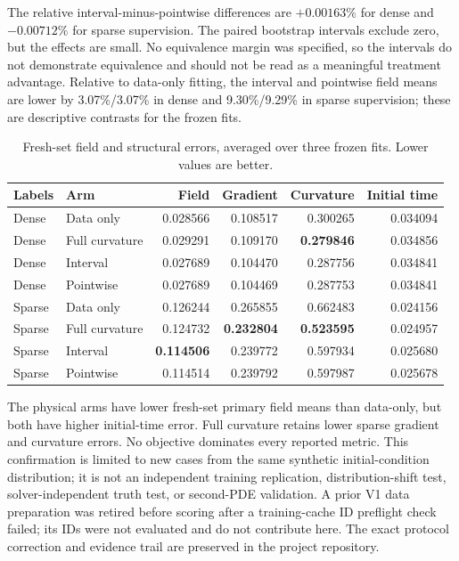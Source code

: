 \documentclass[10pt,a4paper]{article}
\begin{document}
The relative interval-minus-pointwise differences are $+0.00163\%$ for dense and $-0.00712\%$ for sparse supervision. The paired bootstrap intervals exclude zero, but the effects are small. No equivalence margin was specified, so the intervals do not demonstrate equivalence and should not be read as a meaningful treatment advantage. Relative to data-only fitting, the interval and pointwise field means are lower by 3.07\%/3.07\% in dense and 9.30\%/9.29\% in sparse supervision; these are descriptive contrasts for the frozen fits.

\begin{table}[H]
\centering\scriptsize
\caption{Fresh-set field and structural errors, averaged over three frozen fits. Lower values are better.}
\label{tab:allen-fresh-structure}
\begin{tabular}{llrrrr}
\toprule
Labels & Arm & Field & Gradient & Curvature & Initial time \\
\midrule
Dense & Data only & 0.028566 & 0.108517 & 0.300265 & 0.034094 \\
Dense & Full curvature & 0.029291 & 0.109170 & \textbf{0.279846} & 0.034856 \\
Dense & Interval & 0.027689 & 0.104470 & 0.287756 & 0.034841 \\
Dense & Pointwise & 0.027689 & 0.104469 & 0.287753 & 0.034841 \\
\midrule
Sparse & Data only & 0.126244 & 0.265855 & 0.662483 & 0.024156 \\
Sparse & Full curvature & 0.124732 & \textbf{0.232804} & \textbf{0.523595} & 0.024957 \\
Sparse & Interval & \textbf{0.114506} & 0.239772 & 0.597934 & 0.025680 \\
Sparse & Pointwise & 0.114514 & 0.239792 & 0.597987 & 0.025678 \\
\bottomrule
\end{tabular}
\end{table}

The physical arms have lower fresh-set primary field means than data-only, but both have higher initial-time error. Full curvature retains lower sparse gradient and curvature errors. No objective dominates every reported metric. This confirmation is limited to new cases from the same synthetic initial-condition distribution; it is not an independent training replication, distribution-shift test, solver-independent truth test, or second-PDE validation. A prior V1 data preparation was retired before scoring after a training-cache ID preflight check failed; its IDs were not evaluated and do not contribute here. The exact protocol correction and evidence trail are preserved in the project repository.
\end{document}
